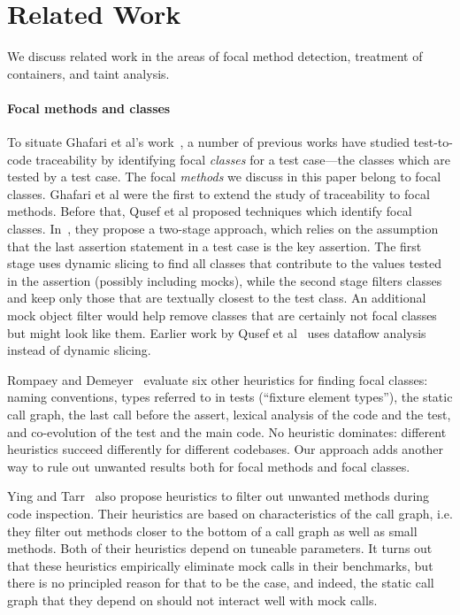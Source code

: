 \section{Related Work}
\label{sec:related}

We discuss related work in the areas of focal method detection,
treatment of containers, and taint analysis.

\paragraph{Focal methods and classes} To situate Ghafari et al's work~\cite{ghafari15:_autom}, a number of previous works have studied test-to-code traceability by identifying focal \emph{classes} for a test case---the classes which are tested by a test case. The focal \emph{methods} we discuss in this paper belong to focal classes. Ghafari et al were the first to extend the study of traceability to focal methods. Before that, Qusef et al proposed techniques which identify focal classes. In~\cite{DBLP:conf/icsm/QusefBOLB11}, they propose a two-stage approach, which relies on the assumption that the last assertion statement in a test case is the key assertion. The first stage uses dynamic slicing to find all classes that contribute to the values tested in the assertion (possibly including mocks), while the second stage filters classes and keep only those that are textually closest to the test class. An additional mock object filter would help remove classes that are certainly not focal classes but might look like them. Earlier work by Qusef et al~\cite{DBLP:conf/icsm/QusefOL10} uses dataflow analysis instead of dynamic slicing.

Rompaey and Demeyer~\cite{rompaey09:_estab_traceab_links_unit_test} evaluate six other heuristics for finding focal classes: naming conventions, types referred to in tests (``fixture element types''), the static call graph, the last call before the assert, lexical analysis of the code and the test, and co-evolution of the test and the main code. No heuristic dominates: different heuristics succeed differently for different codebases. Our approach adds another way to rule out unwanted results both for focal methods and focal classes.

Ying and Tarr~\cite{DBLP:conf/eclipse/YingT07} also propose heuristics to filter out unwanted methods during code inspection. Their heuristics are based on characteristics of the call graph, i.e. they filter out methods closer to the bottom of a call graph as well as small methods. Both of their heuristics depend on tuneable parameters. It turns out that these heuristics empirically eliminate mock calls in their benchmarks, but there is no principled reason for that to be the case, and indeed, the static call graph that they depend on should not interact well with mock calls.

